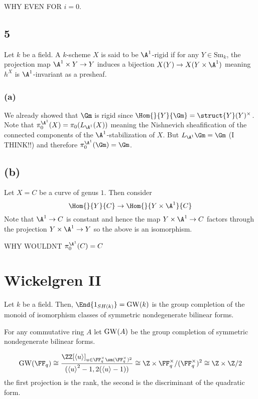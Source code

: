 \documentclass{article}
\newcommand{\Sm}{\mathrm{Sm}}
\begin{document}
{\color{red} WHY EVEN FOR $i = 0$. }

\subsection{5}

Let $k$ be a field. A $k$-scheme $X$ is said to be $\A^1$-rigid if for any $Y \in \Sm_k$, the projection map $\A^1 \times Y \to Y$ induces a bijection $X(Y) \to X(Y \times \A^1)$ meaning $h^X$ is $\A^1$-invariant as a presheaf.

\subsubsection{(a)}

We already showed that $\Gm$ is rigid since $\Hom{}{Y}{\Gm} = \struct{Y}(Y)^\times$. Note that $\pi_0^{\A^1}(X) = \pi_0(L_{\A^1}(X))$ meaning the Nishnevich sheafification of the connected components of the $\A^1$-stabilization of $X$. But $L_{\A^1} \Gm = \Gm$ (I THINK!!) and therefore $\pi_0^{\A^1}(\Gm) = \Gm$.

\subsection{(b)}

Let $X = C$ be a curve of genus $1$. Then consider
\[ \Hom{}{Y}{C} \to \Hom{}{Y \times \A^1}{C} \]
Note that $\A^1 \to C$ is constant and hence the map $Y \times \A^1 \to C$ factors through the projection $Y \times \A^1 \to Y$ so the above is an isomorphism.


{\color{red} WHY WOULDNT $\pi_0^{\A^1}(C) = C$}

\section{Wickelgren II}

\begin{theorem}[Morel]
Let $k$ be a field. Then,
$\End{1_{SH(k)}} = \GW(k)$ is the group completion of the monoid of isomorphism classes of symmetric nondegenerate bilinear forms. 
\end{theorem}

\begin{defn}
For any commutative ring $A$ let $\mathrm{GW}(A)$ be the group completion of symmetric nondegenerate bilinear forms.
\end{defn}

\begin{example}
\[ \GW(\FF_q) \cong \frac{\ZZ[\left< u \right>]_{u \in \FF_q^\times \sm (\FF_q^\times)^2}}{(\left<u\right>^2 - 1, 2 (\left< u \right> - 1))} \cong \Z \times \FF_q^\times / (\FF_q^\times)^2 \cong \Z \times \Z / 2 \]
the first projection is the rank, the second is the discriminant of the quadratic form.
\end{example}
\end{document}
